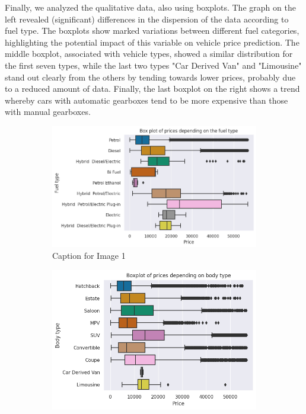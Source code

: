 \documentclass[12pt]{article}
\begin{document}
\noindent Finally, we analyzed the qualitative data, also using boxplots. The graph on the left revealed (significant) differences in the dispersion of the data according to fuel type. The boxplots show marked variations between different fuel categories, highlighting the potential impact of this variable on vehicle price prediction. 
The middle boxplot, associated with vehicle types, showed a similar distribution for the first seven types, while the last two types "Car Derived Van" and "Limousine" stand out clearly from the others by tending towards lower prices, probably due to a reduced amount of data. 
Finally, the last boxplot on the right shows a trend whereby cars with automatic gearboxes tend to be more expensive than those with manual gearboxes.

\FloatBarrier
\begin{figure}[ht]
  \centering
  \begin{subfigure}{0.36\textwidth}
    \includegraphics[width=\linewidth]{fuel type.png}
    \caption{Caption for Image 1}
    \label{fig:image1}
  \end{subfigure}
  \hfill
  \begin{subfigure}{0.32\textwidth}
    \includegraphics[width=\linewidth]{body type.png}

\end{subfigure}
\end{figure}
\end{document}
